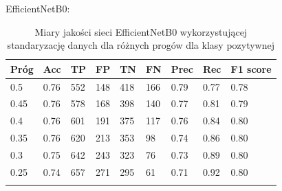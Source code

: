 \documentclass[polish,12pt]{aghthesis}
\begin{document}
\par\noindent EfficientNetB0:
 \begin{longtable}[h!]{|m{2.0cm}|m{1.2cm}|m{1.2cm}|m{1.2cm}|m{1.2cm}|m{1.2cm}|m{1.2cm}|m{1.2cm}|m{1.6cm}|}
 \hline
 Próg & Acc & TP & FP & TN & FN & Prec & Rec & F1 score\\
 \hline
 0.5 & 0.76 & 552 & 148 & 418 & 166 & 0.79 & 0.77 & 0.78\\
 \hline
 0.45 & 0.76 & 578 & 168 & 398 & 140 & 0.77 & 0.81 & 0.79\\
 \hline
 0.4 & 0.76 & 601 & 191 & 375 & 117 & 0.76 & 0.84 & 0.80\\
 \hline
 0.35 & 0.76 & 620 & 213 & 353 & 98 & 0.74 & 0.86 & 0.80\\
 \hline
 0.3 & 0.75 & 642 & 243 & 323 & 76 & 0.73 & 0.89 & 0.80\\
 \hline
 0.25 & 0.74 & 657 & 271 & 295 & 61 & 0.71 & 0.92 & 0.80\\
 \hline
\caption{Miary jakości sieci EfficientNetB0 wykorzystującej standaryzację danych dla różnych progów dla klasy pozytywnej}
\label{table:45}
\end{longtable}
\end{document}
